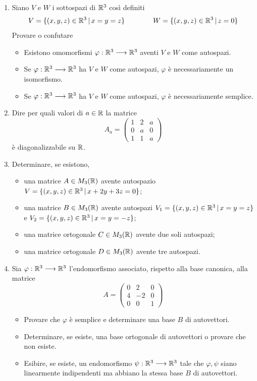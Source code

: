 \begin{enumerate}

\item
Siano $V$ e $W$ i sottospazi di ${\Bbb{R}}^{3}$ cos\`{i} definiti
$$V = \{ (x,y,z) \in {\Bbb{R}}^{3} \,|\, x = y = z \} \qquad \qquad W = \{ (x,y,z) \in {\Bbb{R}}^{3} \,|\, z = 0 \}$$
Provare o confutare
\begin{itemize}
\item[a)] Esistono omomorfismi $\varphi : {\Bbb{R}}^{3} \longrightarrow {\Bbb{R}}^{3}$ aventi $V$ e $W$ come autospazi.
\item[b)] Se $\varphi : {\Bbb{R}}^{3} \longrightarrow {\Bbb{R}}^{3}$ ha $V$ e $W$ come autospazi, $\varphi$ \`{e} necessariamente un isomorfismo.
\item[c)] Se $\varphi : {\Bbb{R}}^{3} \longrightarrow {\Bbb{R}}^{3}$ ha $V$ e $W$ come autospazi, $\varphi$ \`{e} necessariamente semplice.
\end{itemize}

\item Dire per quali valori di $a \in {\Bbb{R}}$ la matrice
$$A_{a} = \left( \begin{array}{ccc} 1 & 2 & a \\ 0 & a & 0 \\ 1 & 1 & a \end{array} \right)$$
\`{e} diagonalizzabile su ${\Bbb{R}}$.

\bigskip

\item Determinare, se esistono,
\begin{itemize}
\item[a)] una matrice $A \in M_{3}({\Bbb{R}})$ avente autospazio $V = \{ (x,y,z) \in {\Bbb{R}}^{3} \,|\, x + 2y + 3z = 0 \}$;
\item[b)] una matrice $B \in M_{3}({\Bbb{R}})$ avente autospazi $V_{1} = \{ (x,y,z) \in {\Bbb{R}}^{3} \,|\, x = y = z \}$ e \linebreak
$V_{2} = \{ (x,y,z) \in {\Bbb{R}}^{3} \,|\, x = y = - z \}$;
\item[c)] una matrice ortogonale $C \in M_{3}({\Bbb{R}})$ avente due soli autospazi;
\item[d)] una matrice ortogonale $D \in M_{3}({\Bbb{R}})$ avente tre autospazi.
\end{itemize}

\item
Sia $\varphi : {\Bbb{R}}^{3} \longrightarrow {\Bbb{R}}^{3}$ l'endomorfismo associato, rispetto alla base canonica, alla matrice
$$A = \left ( \begin{array}{rrr} 0 & 2 & 0 \\ 4 & -2 & 0 \\ 0 & 0 & 1 \end{array} \right )$$
\begin{itemize}
\item[a)] Provare che $\varphi$ \`{e} semplice e determinare una base $B$ di autovettori.
\item[b)] Determinare, se esiste, una base ortogonale di autovettori o provare che non esiste.
\item[c)] Esibire, se esiste, un endomorfismo $\psi : {\Bbb{R}}^{3} \longrightarrow {\Bbb{R}}^{3}$ tale che $\varphi, \psi$ siano linearmente indipendenti ma abbiano la stessa base $B$ di autovettori.
\end{itemize}


\end{enumerate}
